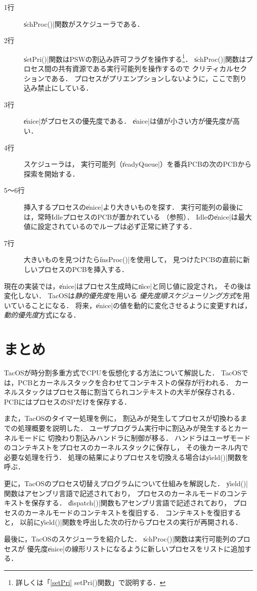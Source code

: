 

\begin{description}
\item[1行] \|schProc()|関数がスケジューラである．
\item[2行] \|setPri()|関数はPSWの割込み許可フラグを操作する\footnote{
  詳しくは「\ref{setPri} setPri()関数」で説明する．}．
  \|schProc()|関数はプロセス間の共有資源である実行可能列を操作するので
  クリティカルセクションである．
  プロセスがプリエンプションしないように，ここで割り込み禁止にしている．
\item[3行] \|enice|がプロセスの優先度である．
  \|enice|は値が小さい方が優先度が高い．
\item[4行] スケジューラは，
  実行可能列（\|readyQueue|）を番兵PCBの次のPCBから探索を開始する．
\item[5〜6行] 挿入するプロセスの\|enice|より大きいものを探す．
  実行可能列の最後には，常時IdleプロセスのPCBが置かれている
  （参照）．
  Idleの\|enice|は最大値に設定されているのでループは必ず正常に終了する．
\item[7行] 大きいものを見つけたら\|insProc()|を使用して，
  見つけたPCBの直前に新しいプロセスのPCBを挿入する．
\end{description}

現在の実装では，\|enice|はプロセス生成時に\|nice|と同じ値に設定され，
その後は変化しない．
TacOSは\emph{静的優先度}を用いる
\emph{優先度順スケジューリング方式}を用いていることになる．
将来，\|enice|の値を動的に変化させるように変更すれば，
\emph{動的優先度}方式になる．

\section{まとめ}
TacOSが時分割多重方式でCPUを仮想化する方法について解説した．
TacOSでは，PCBとカーネルスタックを合わせてコンテキストの保存が行われる．
カーネルスタックはプロセス毎に割当てられコンテキストの大半が保存される．
PCBにはプロセスのSPだけを保存する．

また，TacOSのタイマー処理を例に，
割込みが発生してプロセスが切換わるまでの処理概要を説明した．
ユーザプログラム実行中に割込みが発生するとカーネルモードに
切換わり割込みハンドラに制御が移る．
ハンドラはユーザモードのコンテキストをプロセスのカーネルスタックに保存し，
その後カーネル内で必要な処理を行う．
処理の結果によりプロセスを切換える場合は\|yield()|関数を呼ぶ．

更に，TacOSのプロセス切替えプログラムについて仕組みを解説した．
\|yield()|関数はアセンブリ言語で記述されており，
プロセスのカーネルモードのコンテキストを保存する．
\|dispatch()|関数もアセンブリ言語で記述されており，
プロセスのカーネルモードのコンテキストを復旧する．
コンテキストを復旧すると，
以前に\|yield()|関数を呼出した次の行からプロセスの実行が再開される．

最後に，TacOSのスケジューラを紹介した．
\|schProc()|関数は実行可能列のプロセスが
優先度\|enice|の線形リストになるように新しいプロセスをリストに追加する．
